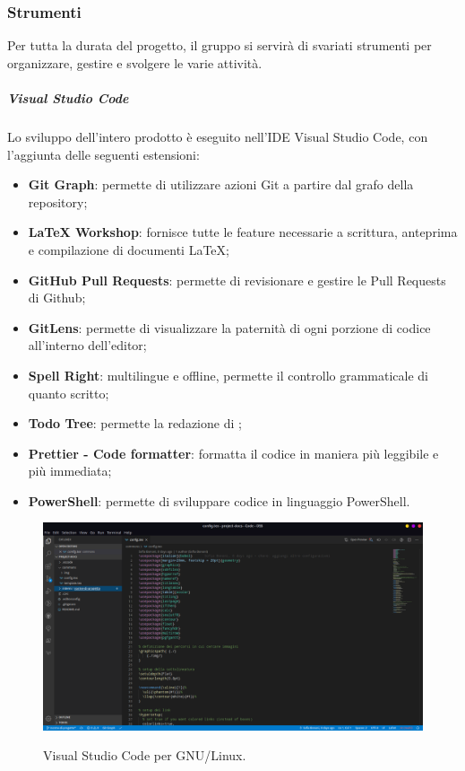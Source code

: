 \documentclass[../norme-di-progetto.tex]{subfiles}
\begin{document}
\subsubsection{Strumenti}
Per tutta la durata del progetto, il gruppo si servirà di svariati strumenti per organizzare, gestire e svolgere le varie attività.
\subparagraph{Visual Studio Code}
Lo sviluppo dell'intero prodotto è eseguito nell'IDE Visual Studio Code, con l'aggiunta delle seguenti estensioni:
\begin{itemize}
  \item \textbf{Git Graph}: permette di utilizzare azioni Git a partire dal grafo della repository;
  \item \textbf{LaTeX Workshop}: fornisce tutte le feature necessarie a scrittura, anteprima e compilazione di documenti \LaTeX;
  \item \textbf{GitHub Pull Requests}: permette di revisionare e gestire le Pull Requests di Github;
  \item \textbf{GitLens}: permette di visualizzare la paternità di ogni porzione di codice all'interno dell'editor;
  \item \textbf{Spell Right}:  multilingue e offline, permette il controllo grammaticale di quanto scritto;
  \item \textbf{Todo Tree}: permette la redazione di ;
  \item \textbf{Prettier - Code formatter}: formatta il codice in maniera più leggibile e più immediata;
  \item \textbf{PowerShell}: permette di sviluppare codice in linguaggio PowerShell.
\end{itemize}

\begin{figure}[H]
  \centering
  \includegraphics[width=15cm]{img/vscode.png}
  \label{fig:github}
  \caption{Visual Studio Code per GNU/Linux.}
\end{figure}
\end{document}
